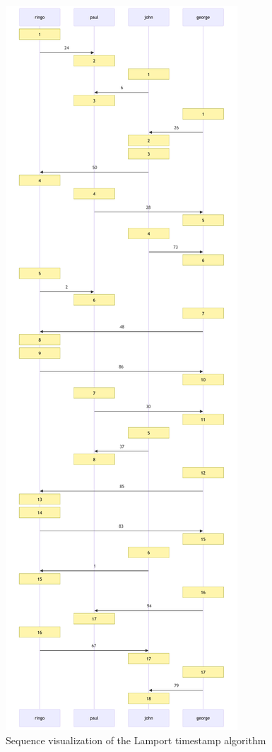 \documentclass[a4paper, 11pt]{article}
\begin{document}
\begin{figure}[H]
  \begin{center}
    \includegraphics[height=\textheight]{graphics/mermaid_lamport.pdf}
    \caption{Sequence visualization of the Lamport timestamp algorithm}
    \label{fig:seq1}
  \end{center}
\end{figure}
\end{document}
